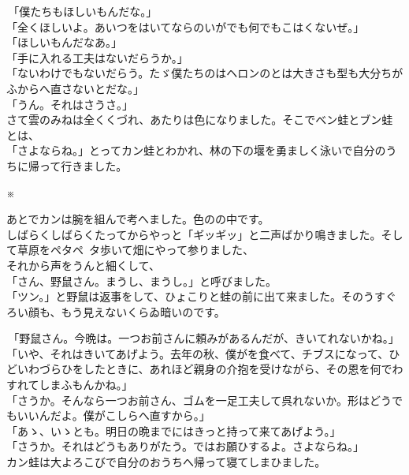 \documentclass[
a4paper,
10pt,
book]
{tarticle}
\begin{document}
\newpage
\setcounter{page}{3}
\thispagestyle{fancy}
\begin{linenumbers}
\noindent \,「僕たちもほしいもんだな。」\\
「全くほしいよ。あいつをはいてならのいがでも何でもこはくないぜ。」\\
「ほしいもんだなあ。」\\
「手に入れる工夫はないだらうか。」\\
「ないわけでもないだらう。たゞ僕たちのはヘロンのとは大きさも型も大分ちがふからへ直さないとだな。」\\
「うん。それはさうさ。」\\
\indent さて雲のみねは全くくづれ、あたりは色になりました。そこでベン蛙とブン蛙とは、\\
「さよならね。」とってカン蛙とわかれ、林の下の堰を勇ましく泳いで自分のうちに帰って行きました。
\end{linenumbers}
\nolinenumbers
\indent \indent \indent \indent \indent \indent \indent \indent \indent \indent ※

\begin{linenumbers}
  \indent あとでカンは腕を組んで考へました。色のの中です。\\
  しばらくしばらくたってからやっと「ギッギッ」と二声ばかり鳴きました。そして草原をペタペ~タ歩いて畑にやって参りました、\\
  \indent それから声をうんと細くして、\\
  「さん、野鼠さん。まうし、まうし。」と呼びました。\\
  「ツン。」と野鼠は返事をして、ひょこりと蛙の前に出て来ました。そのうすぐろい顔も、もう見えないくらゐ暗いのです。
\end{linenumbers}

\newpage
\setcounter{page}{6}
\thispagestyle{fancy}
\begin{linenumbers}
\noindent \,「野鼠さん。今晩は。一つお前さんに頼みがあるんだが、きいてれないかね。」\\
「いや、それはきいてあげよう。去年の秋、僕がを食べて、チブスになって、ひどいわづらひをしたときに、あれほど親身の介抱を受けながら、その恩を何でわすれてしまふもんかね。」\\
「さうか。そんなら一つお前さん、ゴムを一足工夫して呉れないか。形はどうでもいいんだよ。僕がこしらへ直すから。」\\
「あゝ、いゝとも。明日の晩までにはきっと持って来てあげよう。」\\
「さうか。それはどうもありがたう。ではお願ひするよ。さよならね。」\\
\indent カン蛙は大よろこびで自分のおうちへ帰って寝てしまひました。
\end{linenumbers}
\end{document}
